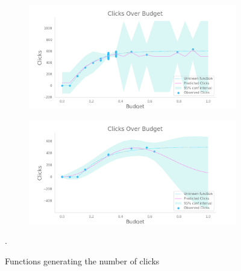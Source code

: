 \begin{figure}[!htb]
	\begin{subfigure}[!H]{0.8\textwidth}
		\centering
		\includegraphics[width=\textwidth]{images/part2_bidding_curve_subcamaign_1.png}
	\end{subfigure}
	\begin{subfigure}[!H]{0.8\textwidth}
		\centering
		\includegraphics[width=\textwidth]{images/part2_bidding_curve_subcamaign_2.png}
	\end{subfigure}

	\caption{Functions generating the number of clicks}.
	\label{curve2Fig}
\end{figure}

